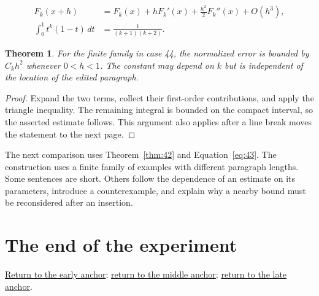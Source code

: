 \documentclass[a4paper,10pt]{article}
\newtheorem{theorem}{Theorem}[section]
\begin{document}
\lipsum[10-11]
\begin{align}\label{eq:43}
 F_k(x+h)&=F_k(x)+hF_k'(x)+\frac{h^2}{2}F_k''(x)+O(h^3),\\
 \int_0^1 t^k(1-t)\,dt&=\frac{1}{(k+1)(k+2)}.
\end{align}
\begin{theorem}\label{thm:43}
For the finite family in case 44, the normalized error is bounded by $C_k h^2$ whenever $0<h<1$. The constant may depend on $k$ but is independent of the location of the edited paragraph.
\end{theorem}
\begin{proof}
Expand the two terms, collect their first-order contributions, and apply the
triangle inequality. The remaining integral is bounded on the compact interval,
so the asserted estimate follows. This argument also applies after a line break
moves the statement to the next page.
\end{proof}
The next comparison uses Theorem~\ref{thm:42} and Equation~\ref{eq:43}. The construction uses a finite family of examples with different paragraph lengths. Some sentences are short. Others follow the dependence of an estimate on its parameters, introduce a counterexample, and explain why a nearby bound must be reconsidered after an insertion.

\lipsum[18]

\section*{The end of the experiment}
\hyperref[anchor:early]{Return to the early anchor}; \hyperref[anchor:middle]{return to the middle anchor}; \hyperref[anchor:late]{return to the late anchor}.
\end{document}
